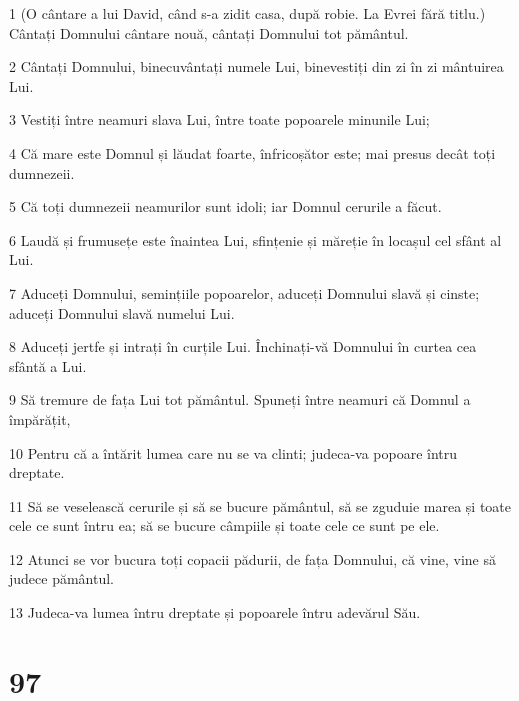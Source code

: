 \par 1 (O cântare a lui David, când s-a zidit casa, după robie. La Evrei fără titlu.) Cântați Domnului cântare nouă, cântați Domnului tot pământul.
\par 2 Cântați Domnului, binecuvântați numele Lui, binevestiți din zi în zi mântuirea Lui.
\par 3 Vestiți între neamuri slava Lui, între toate popoarele minunile Lui;
\par 4 Că mare este Domnul și lăudat foarte, înfricoșător este; mai presus decât toți dumnezeii.
\par 5 Că toți dumnezeii neamurilor sunt idoli; iar Domnul cerurile a făcut.
\par 6 Laudă și frumusețe este înaintea Lui, sfințenie și măreție în locașul cel sfânt al Lui.
\par 7 Aduceți Domnului, semințiile popoarelor, aduceți Domnului slavă și cinste; aduceți Domnului slavă numelui Lui.
\par 8 Aduceți jertfe și intrați în curțile Lui. Închinați-vă Domnului în curtea cea sfântă a Lui.
\par 9 Să tremure de fața Lui tot pământul. Spuneți între neamuri că Domnul a împărățit,
\par 10 Pentru că a întărit lumea care nu se va clinti; judeca-va popoare întru dreptate.
\par 11 Să se veselească cerurile și să se bucure pământul, să se zguduie marea și toate cele ce sunt întru ea; să se bucure câmpiile și toate cele ce sunt pe ele.
\par 12 Atunci se vor bucura toți copacii pădurii, de fața Domnului, că vine, vine să judece pământul.
\par 13 Judeca-va lumea întru dreptate și popoarele întru adevărul Său.

\chapter{97}

